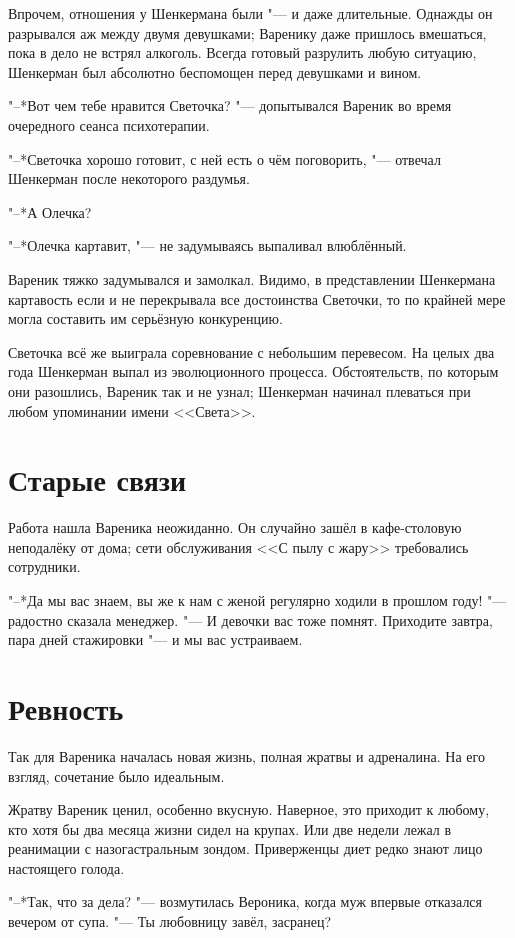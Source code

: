 Впрочем, отношения у Шенкермана были "--- и даже длительные.
Однажды он разрывался аж между двумя девушками;
Варенику даже пришлось вмешаться, пока в дело не встрял алкоголь.
Всегда готовый разрулить любую ситуацию, Шенкерман был абсолютно беспомощен перед девушками и вином.

"--*Вот чем тебе нравится Светочка? "--- допытывался Вареник во время очередного сеанса психотерапии.

"--*Светочка хорошо готовит, с ней есть о чём поговорить, "--- отвечал Шенкерман после некоторого раздумья.

"--*А Олечка?

"--*Олечка картавит, "--- не задумываясь выпаливал влюблённый.

Вареник тяжко задумывался и замолкал.
Видимо, в представлении Шенкермана картавость если и не перекрывала все достоинства Светочки, то по крайней мере могла составить им серьёзную конкуренцию.

Светочка всё же выиграла соревнование с небольшим перевесом.
На целых два года Шенкерман выпал из эволюционного процесса.
Обстоятельств, по которым они разошлись, Вареник так и не узнал;
Шенкерман начинал плеваться при любом упоминании имени <<Света>>.

\section{Старые связи}

Работа нашла Вареника неожиданно.
Он случайно зашёл в кафе-столовую неподалёку от дома;
сети обслуживания <<С пылу с жару>> требовались сотрудники.

"--*Да мы вас знаем, вы же к нам с женой регулярно ходили в прошлом году! "--- радостно сказала менеджер.
"--- И девочки вас тоже помнят.
Приходите завтра, пара дней стажировки "--- и мы вас устраиваем.

\section{Ревность}

Так для Вареника началась новая жизнь, полная жратвы и адреналина.
На его взгляд, сочетание было идеальным.

Жратву Вареник ценил, особенно вкусную.
Наверное, это приходит к любому, кто хотя бы два месяца жизни сидел на крупах.
Или две недели лежал в реанимации с назогастральным зондом.
Приверженцы диет редко знают лицо настоящего голода.

"--*Так, что за дела? "--- возмутилась Вероника, когда муж впервые отказался вечером от супа.
"--- Ты любовницу завёл, засранец?


